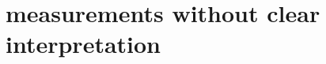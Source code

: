 \documentclass[
10pt,					%
a4paper,				%
twoside,				%
BCOR=8mm,				%
headings=normal,		%
headsepline,			%
footsepline,			%
plainfootsepline,		%
]{scrbook}
\begin{document}
   \section{measurements without clear interpretation}
      
	\printindex
\backmatter{}
  \printbibliography  
  
  
  
  
  

\end{document}
